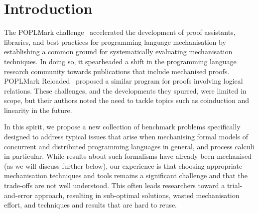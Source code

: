 \documentclass[runningheads]{llncs}
\begin{document}
\section{Introduction}
The POPLMark challenge~\cite{POPLMark} accelerated the development of proof assistants, libraries, and best practices for programming language mechanisation by establishing a common ground for systematically evaluating mechanisation techniques.
In doing so, it spearheaded a shift in the programming language research community towards publications that include mechanised proofs.
POPLMark Reloaded~\cite{POPLMarkReloaded} proposed a similar program for proofs involving logical relations.
These challenges, and the developments they spurred, were limited in scope, but their authors noted the need to tackle topics such as coinduction and linearity in the future.

In this spirit, we propose a new collection of benchmark problems specifically designed to address typical issues that arise when mechanising formal models of concurrent and distributed programming languages in general, and process calculi in particular. 
While results about such formalisms have already been mechanised (as we will discuss further below), our experience is that choosing appropriate mechanisation techniques and tools remains a significant challenge and that the trade-offs are not well understood.
This often leads researchers toward a trial-and-error approach, resulting in sub-optimal solutions, wasted mechanisation effort, and techniques and results that are hard to reuse.
\end{document}
